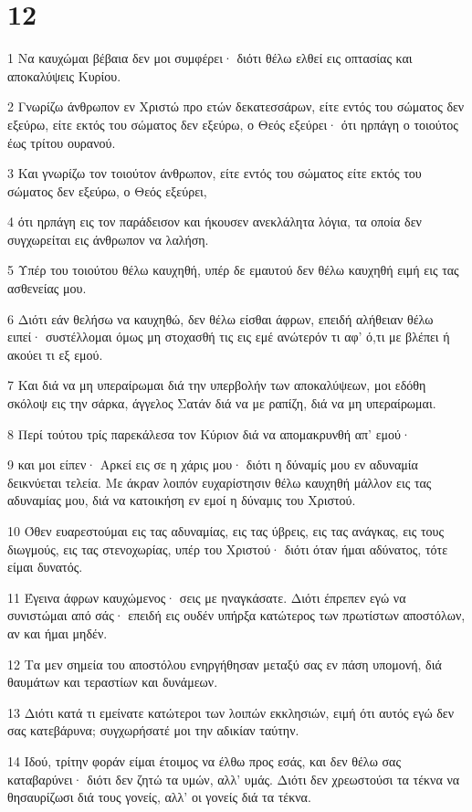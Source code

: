 \chapter{12}

\par 1 Να καυχώμαι βέβαια δεν μοι συμφέρει· διότι θέλω ελθεί εις οπτασίας και αποκαλύψεις Κυρίου.
\par 2 Γνωρίζω άνθρωπον εν Χριστώ προ ετών δεκατεσσάρων, είτε εντός του σώματος δεν εξεύρω, είτε εκτός του σώματος δεν εξεύρω, ο Θεός εξεύρει· ότι ηρπάγη ο τοιούτος έως τρίτου ουρανού.
\par 3 Και γνωρίζω τον τοιούτον άνθρωπον, είτε εντός του σώματος είτε εκτός του σώματος δεν εξεύρω, ο Θεός εξεύρει,
\par 4 ότι ηρπάγη εις τον παράδεισον και ήκουσεν ανεκλάλητα λόγια, τα οποία δεν συγχωρείται εις άνθρωπον να λαλήση.
\par 5 Υπέρ του τοιούτου θέλω καυχηθή, υπέρ δε εμαυτού δεν θέλω καυχηθή ειμή εις τας ασθενείας μου.
\par 6 Διότι εάν θελήσω να καυχηθώ, δεν θέλω είσθαι άφρων, επειδή αλήθειαν θέλω ειπεί· συστέλλομαι όμως μη στοχασθή τις εις εμέ ανώτερόν τι αφ' ό,τι με βλέπει ή ακούει τι εξ εμού.
\par 7 Και διά να μη υπεραίρωμαι διά την υπερβολήν των αποκαλύψεων, μοι εδόθη σκόλοψ εις την σάρκα, άγγελος Σατάν διά να με ραπίζη, διά να μη υπεραίρωμαι.
\par 8 Περί τούτου τρίς παρεκάλεσα τον Κύριον διά να απομακρυνθή απ' εμού·
\par 9 και μοι είπεν· Αρκεί εις σε η χάρις μου· διότι η δύναμίς μου εν αδυναμία δεικνύεται τελεία. Με άκραν λοιπόν ευχαρίστησιν θέλω καυχηθή μάλλον εις τας αδυναμίας μου, διά να κατοικήση εν εμοί η δύναμις του Χριστού.
\par 10 Όθεν ευαρεστούμαι εις τας αδυναμίας, εις τας ύβρεις, εις τας ανάγκας, εις τους διωγμούς, εις τας στενοχωρίας, υπέρ του Χριστού· διότι όταν ήμαι αδύνατος, τότε είμαι δυνατός.
\par 11 Έγεινα άφρων καυχώμενος· σεις με ηναγκάσατε. Διότι έπρεπεν εγώ να συνιστώμαι από σάς· επειδή εις ουδέν υπήρξα κατώτερος των πρωτίστων αποστόλων, αν και ήμαι μηδέν.
\par 12 Τα μεν σημεία του αποστόλου ενηργήθησαν μεταξύ σας εν πάση υπομονή, διά θαυμάτων και τεραστίων και δυνάμεων.
\par 13 Διότι κατά τι εμείνατε κατώτεροι των λοιπών εκκλησιών, ειμή ότι αυτός εγώ δεν σας κατεβάρυνα; συγχωρήσατέ μοι την αδικίαν ταύτην.
\par 14 Ιδού, τρίτην φοράν είμαι έτοιμος να έλθω προς εσάς, και δεν θέλω σας καταβαρύνει· διότι δεν ζητώ τα υμών, αλλ' υμάς. Διότι δεν χρεωστούσι τα τέκνα να θησαυρίζωσι διά τους γονείς, αλλ' οι γονείς διά τα τέκνα.
